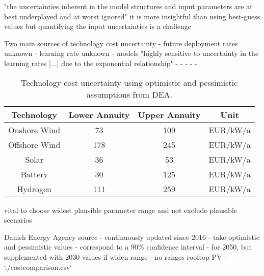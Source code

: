 

"the uncertainties inherent in the model structures and input parameters are at best underplayed and at worst ignored" \cite{yue_review_2018}
it is more insightful than using best-guess values \cite{fraiture_robustness_2020}
but quantifying the input uncertainties is a challenge \cite{moret_characterization_2017}

Two main sources of technology cost uncertainty \cite{trondle_trade-offs_2020}
- future deployment rates unknown
- learning rate unknown
- models "highly sensitive to uncertainty in the learning rates [...] due to the exponential relationship" \cite{mattsson_learning_2019}
- \cite{yeh_review_2012}
- \cite{heuberger_power_2017}
- \cite{gritsevskyi_modeling_2000}
- \cite{schmidt_projecting_2019}
- \cite{schmidt_future_2017}


\begin{SCtable}
    \begin{small}
        \begin{tabular}{cccc}
            \toprule
            Technology & Lower Annuity & Upper Annuity & Unit  \\ \midrule
            Onshore Wind & 73 & 109 & EUR/kW/a \\
            Offshore Wind & 178 & 245 & EUR/kW/a \\ %
            Solar & 36 & 53 & EUR/kW/a \\
            Battery & 30 & 125 & EUR/kW/a \\
            Hydrogen & 111 & 259 & EUR/kW/a \\ \bottomrule
        \end{tabular}
    \end{small}
    \caption{Technology cost uncertainty using optimistic and pessimistic assumptions from DEA.}
    \label{tab:costuncertainty}
\end{SCtable}   

vital to choose widest plausible parameter range and not exclude plausible scenarios \cite{moret_characterization_2017,mccollum_energy_2020}

Danish Energy Agency source
- continuously updated since 2016
- take optimistic and pessimistic values
- correspond to a 90\% confidence interval
- for 2050, but supplemented with 2030 values if widen range
- no ranges rooftop PV
- `./costcomparison.csv`

